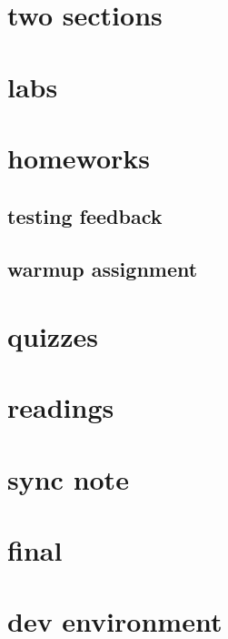 %

\section{two sections}

\section{labs}


\section{homeworks}


\subsection{testing feedback}


\subsection{warmup assignment}


\section{quizzes}


\section{readings}


\section{sync note}


\section{final}


\section{dev environment}


